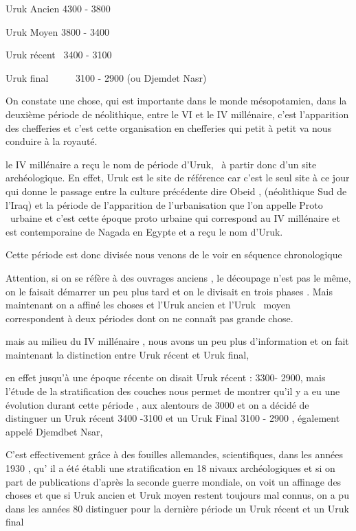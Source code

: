 \documentclass[a4paper]{article}
\begin{document}
{
Uruk Ancien 4300 - 3800}

{
Uruk Moyen 3800 - 3400}

{
Uruk récent \ 3400 - 3100}

{
Uruk final \ \ \ \ \ 3100 - 2900 (ou Djemdet Nasr)}


\bigskip

{
On constate une chose, qui est importante dans le monde mésopotamien, dans la deuxième période de néolithique, entre le
VI et le IV millénaire, c'est l'apparition des chefferies et c'est cette organisation en chefferies qui petit à petit
va nous conduire à la royauté.}


\bigskip

{
le IV millénaire a reçu le nom de période d'Uruk, \ à partir donc d'un site archéologique. En effet, Uruk est le site de
référence car c'est le seul site à ce jour qui donne le passage entre la culture précédente dire Obeid , (néolithique
Sud de l'Iraq) et la période de l'apparition de l'urbanisation que l'on appelle Proto \ urbaine et c'est cette époque
proto urbaine qui correspond au IV millénaire et est contemporaine de Nagada en Egypte et a reçu le nom d'Uruk.}


\bigskip

{
Cette période est donc divisée nous venons de le voir en séquence chronologique}

{
Attention, si on se réfère à des ouvrages anciens , le découpage n'est pas le même, on le faisait démarrer un peu plus
tard et on le divisait en trois phases . Mais maintenant on a affiné les choses et l'Uruk ancien et l'Uruk \ moyen
correspondent à deux périodes dont on ne connaît pas grande chose.}

{
mais au milieu du IV millénaire , nous avons un peu plus d'information et on fait maintenant la distinction entre Uruk
récent et Uruk final,}

{
en effet jusqu'à une époque récente on disait Uruk récent : 3300- 2900, mais l'étude de la stratification des couches
nous permet de montrer qu'il y a eu une évolution durant cette période , aux alentours de 3000 et on a décidé de
distinguer un Uruk récent 3400 -3100 et un Uruk Final 3100 - 2900 , également appelé Djemdbet Nsar, }

{
C'est effectivement grâce à des fouilles allemandes, scientifiques, dans les années 1930 , qu' il a été établi une
stratification en 18 nivaux archéologiques et si on part de publications d'après la seconde guerre mondiale, on voit un
affinage des choses et que si Uruk ancien et Uruk moyen restent toujours mal connus, on a pu dans les années 80
distinguer pour la dernière période un Uruk récent et un Uruk final}
\end{document}
